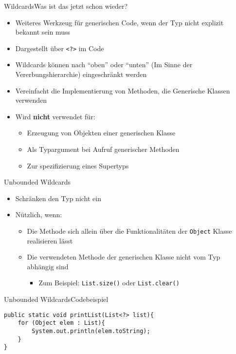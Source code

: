 \begin{frame}{Wildcards}{Was ist das jetzt schon wieder?}
    \begin{itemize}
        \item Weiteres Werkzeug für generischen Code, wenn der Typ nicht explizit bekannt sein muss
        \item Dargestellt über \texttt{<?>} im Code
        \item Wildcards können nach "`oben"' oder "`unten"' (Im Sinne der Vererbungshierarchie) eingeschränkt werden
        \item Vereinfacht die Implementierung von Methoden, die Generische Klassen verwenden
        \item Wird \textbf{nicht} verwendet für:
        \begin{itemize}
            \item Erzeugung von Objekten einer generischen Klasse
            \item Als Typargument bei Aufruf generischer Methoden
            \item Zur spezifizierung eines Supertyps
        \end{itemize}
    \end{itemize}
\end{frame}

\begin{frame}{Unbounded Wildcards}
    \begin{itemize}
        \item Schränken den Typ nicht ein
        \item Nützlich, wenn:
        \begin{itemize}
            \item Die Methode sich allein über die Funktionalitäten der \texttt{Object} Klasse realisieren lässt
            \item Die verwendeten Methode der generischen Klasse nicht vom Typ abhängig sind
            \begin{itemize}
                \item Zum Beispiel: \texttt{List.size()} oder \texttt{List.clear()}
            \end{itemize}
        \end{itemize}
    \end{itemize}
\end{frame}

\begin{frame}[fragile]{Unbounded Wildcards}{Codebeispiel}
\lstset{style=javacode}
\begin{lstlisting}
public static void printList(List<?> list){
    for (Object elem : List){
        System.out.println(elem.toString);
    }
}
\end{lstlisting}
\end{frame}

